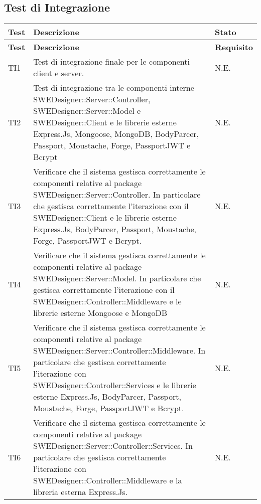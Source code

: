 \subsection{Test di Integrazione}
\begin{longtable}{p{2cm}!{\VRule[1pt]}p{10cm}!{\VRule[1pt]}p{1cm}}
\color{white} \textbf{Test} & \color{white} \textbf{Descrizione}  & \color{white} \textbf{Stato}\\ 
\endfirsthead 
{} 
\color{white} \textbf{Test} & \color{white} \textbf{Descrizione}  & \color{white} \textbf{Requisito}\\  
\endhead 
TI1 & Test di integrazione finale per le componenti client e server. & N.E.\\

TI2 & Test di integrazione tra le componenti interne SWEDesigner::Server::Controller, SWEDesigner::Server::Model e SWEDesigner::Client e le librerie esterne Express.Js, Mongoose, MongoDB, BodyParcer, Passport, Moustache, Forge, PassportJWT e Bcrypt & N.E.\\

TI3 & Verificare che il sistema gestisca correttamente le componenti relative al package SWEDesigner::Server::Controller. In particolare che gestisca correttamente l'iterazione con il SWEDesigner::Client e le librerie esterne Express.Js, BodyParcer, Passport, Moustache, Forge, PassportJWT e Bcrypt. & N.E.\\

TI4 & Verificare che il sistema gestisca correttamente le componenti relative al package SWEDesigner::Server::Model. In particolare che gestisca correttamente l'iterazione con il SWEDesigner::Controller::Middleware e le librerie esterne Mongoose e MongoDB  & N.E.\\

TI5 & Verificare che il sistema gestisca correttamente le componenti relative al package SWEDesigner::Server::Controller::Middleware. In particolare che gestisca correttamente l'iterazione con SWEDesigner::Controller::Services e le librerie esterne Express.Js, BodyParcer, Passport, Moustache, Forge, PassportJWT e Bcrypt. & N.E.\\

TI6 & Verificare che il sistema gestisca correttamente le componenti relative al package SWEDesigner::Server::Controller::Services. In particolare che gestisca correttamente l'iterazione con SWEDesigner::Controller::Middleware e la libreria esterna Express.Js. & N.E.\\


\end{longtable}
